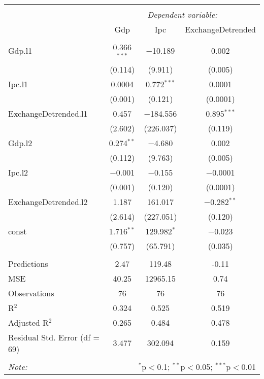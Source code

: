 
\begin{table}[H] \centering 
  \caption{} 
  \label{tb:var_2} 
\begin{tabular}{@{\extracolsep{5pt}}lccc} 
\\[-1.8ex]\hline 
\hline \\[-1.8ex] 
 & \multicolumn{3}{c}{\textit{Dependent variable:}} \\ 
\cline{2-4} 
 & Gdp & Ipc & ExchangeDetrended \\ 
\hline \\[-1.8ex] 
 Gdp.l1 & 0.366$^{***}$ & $-$10.189 & 0.002 \\ 
  & (0.114) & (9.911) & (0.005) \\ 
  Ipc.l1 & 0.0004 & 0.772$^{***}$ & 0.0001 \\ 
  & (0.001) & (0.121) & (0.0001) \\ 
  ExchangeDetrended.l1 & 0.457 & $-$184.556 & 0.895$^{***}$ \\ 
  & (2.602) & (226.037) & (0.119) \\ 
  Gdp.l2 & 0.274$^{**}$ & $-$4.680 & 0.002 \\ 
  & (0.112) & (9.763) & (0.005) \\ 
  Ipc.l2 & $-$0.001 & $-$0.155 & $-$0.0001 \\ 
  & (0.001) & (0.120) & (0.0001) \\ 
  ExchangeDetrended.l2 & 1.187 & 161.017 & $-$0.282$^{**}$ \\ 
  & (2.614) & (227.051) & (0.120) \\ 
  const & 1.716$^{**}$ & 129.982$^{*}$ & $-$0.023 \\ 
  & (0.757) & (65.791) & (0.035) \\ 
 \hline \\[-1.8ex] 
Predictions & 2.47 & 119.48 & -0.11 \\ 
MSE & 40.25 & 12965.15 & 0.74 \\ 
Observations & 76 & 76 & 76 \\ 
R$^{2}$ & 0.324 & 0.525 & 0.519 \\ 
Adjusted R$^{2}$ & 0.265 & 0.484 & 0.478 \\ 
Residual Std. Error (df = 69) & 3.477 & 302.094 & 0.159 \\ 
\hline 
\hline \\[-1.8ex] 
\textit{Note:}  & \multicolumn{3}{r}{$^{*}$p$<$0.1; $^{**}$p$<$0.05; $^{***}$p$<$0.01} \\ 
\end{tabular} 
\end{table} 
